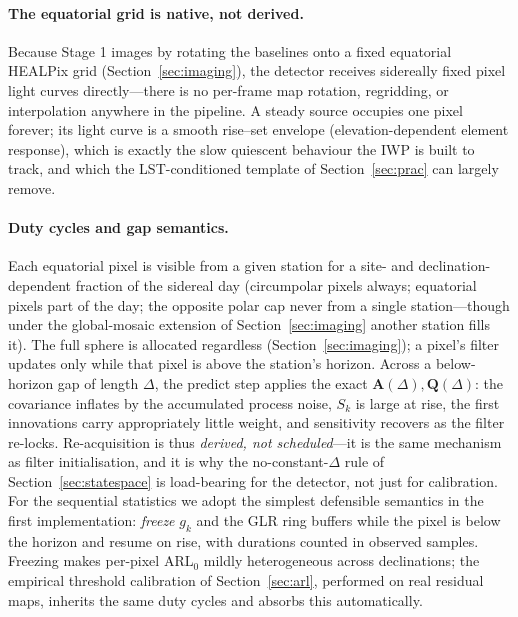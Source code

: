 \documentclass[11pt]{article}
\begin{document}
\paragraph{The equatorial grid is native, not derived.} Because Stage 1 images by rotating the
baselines onto a fixed equatorial HEALPix grid (Section~\ref{sec:imaging}), the detector receives
sidereally fixed pixel light curves directly---there is no per-frame map rotation, regridding, or
interpolation anywhere in the pipeline. A steady source occupies one pixel forever; its light curve
is a smooth rise--set envelope (elevation-dependent element response), which is exactly the slow
quiescent behaviour the IWP is built to track, and which the LST-conditioned template of
Section~\ref{sec:prac} can largely remove.

\paragraph{Duty cycles and gap semantics.} Each equatorial pixel is visible from a given station for
a site- and declination-dependent fraction of the sidereal day (circumpolar pixels always;
equatorial pixels part of the day; the opposite polar cap never from a single station---though under
the global-mosaic extension of Section~\ref{sec:imaging} another station fills it). The full sphere
is allocated regardless (Section~\ref{sec:imaging}); a pixel's filter updates only while that pixel
is above the station's horizon. Across a below-horizon gap of length
$\Delta$, the predict step applies the exact $\bm{A}(\Delta),\bm{Q}(\Delta)$: the covariance
inflates by the accumulated process noise, $S_k$ is large at rise, the first innovations carry
appropriately little weight, and sensitivity recovers as the filter re-locks. Re-acquisition is
thus \emph{derived, not scheduled}---it is the same mechanism as filter initialisation, and it is
why the no-constant-$\Delta$ rule of Section~\ref{sec:statespace} is load-bearing for the detector,
not just for calibration. For the sequential statistics we adopt the simplest defensible semantics
in the first implementation: \emph{freeze} $g_k$ and the GLR ring buffers while the pixel is below
the horizon and resume on rise, with durations counted in observed samples. Freezing makes
per-pixel $\mathrm{ARL}_0$ mildly heterogeneous across declinations; the empirical threshold
calibration of Section~\ref{sec:arl}, performed on real residual maps, inherits the same duty
cycles and absorbs this automatically.
\end{document}
